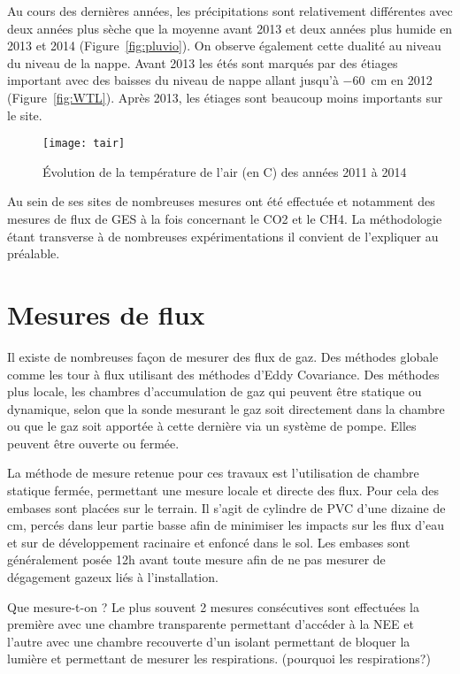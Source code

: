 Au cours des dernières années, les précipitations sont relativement différentes avec deux années plus sèche que la moyenne avant 2013 et deux années plus humide en 2013 et 2014 (Figure~\ref{fig:pluvio}).
On observe également cette dualité au niveau du niveau de la nappe.
Avant 2013 les étés sont marqués par des étiages important avec des baisses du niveau de nappe allant jusqu'à \SI{-60}{\cm} en 2012 (Figure~\ref{fig:WTL}).
Après 2013, les étiages sont beaucoup moins importants sur le site.



\begin{figure}
\centering
\texttt{[image: tair]}
\caption{Évolution de la température de l'air (en \textdegree C) des années 2011 à 2014}
\label{fig:tair}
\end{figure}



Au sein de ses sites de nombreuses mesures ont été effectuée et notamment des mesures de flux de GES à la fois concernant le CO2 et le CH4. La méthodologie étant transverse à de nombreuses expérimentations il convient de l'expliquer au préalable.

\section{Mesures de flux}
\label{sec:clsd_chbr_method}

Il existe de nombreuses façon de mesurer des flux de gaz. 
Des méthodes globale comme les tour à flux utilisant des méthodes d'Eddy Covariance. 
Des méthodes plus locale, les chambres d'accumulation de gaz qui peuvent être statique ou dynamique, selon que la sonde mesurant le gaz soit directement dans la chambre ou que le gaz soit apportée à cette dernière via un système de pompe. Elles peuvent être ouverte ou fermée.

La méthode de mesure retenue pour ces travaux est l'utilisation de chambre statique fermée, permettant une mesure locale et directe des flux.
Pour cela des embases sont placées sur le terrain. Il s'agit de cylindre de PVC d'une dizaine de cm, percés dans leur partie basse afin de minimiser les impacts sur les flux d'eau et sur de développement racinaire et enfoncé dans le sol.
Les embases sont généralement posée 12h avant toute mesure afin de ne pas mesurer de dégagement gazeux liés à l'installation.

Que mesure-t-on ?
Le plus souvent 2 mesures consécutives sont effectuées la première avec une chambre transparente permettant d'accéder à la NEE et l'autre avec une chambre recouverte d'un isolant permettant de bloquer la lumière et permettant de mesurer les respirations. (pourquoi les respirations?)

